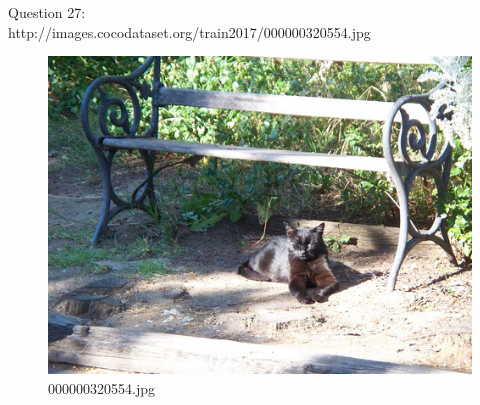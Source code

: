     Question 27:\\http://images.cocodataset.org/train2017/000000320554.jpg
    \begin{figure}[h]
        \centering
        \includegraphics[width=0.8\linewidth]{../image set/easy/000000320554.jpg}
        \caption{000000320554.jpg}
    \end{figure}
